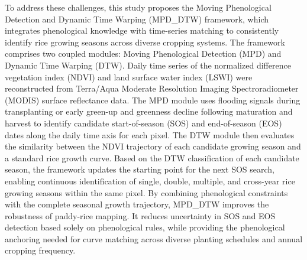 To address these challenges, this study proposes the Moving Phenological Detection and Dynamic Time Warping (MPD\_DTW) framework, which integrates phenological knowledge with time-series matching to consistently identify rice growing seasons across diverse cropping systems.
The framework comprises two coupled modules: Moving Phenological Detection (MPD) and Dynamic Time Warping (DTW). 
Daily time series of the normalized difference vegetation index (NDVI) and land surface water index (LSWI) were reconstructed from Terra/Aqua Moderate Resolution Imaging Spectroradiometer (MODIS) surface reflectance data. The MPD module uses flooding signals during transplanting or early green-up and greenness decline following maturation and harvest to identify candidate start-of-season (SOS) and end-of-season (EOS) dates along the daily time axis for each pixel.
The DTW module then evaluates the similarity between the NDVI trajectory of each candidate growing season and a standard rice growth curve. %
Based on the DTW classification of each candidate season, the framework updates the starting point for the next SOS search, enabling continuous identification of single, double, multiple, and cross-year rice growing seasons within the same pixel.
By combining phenological constraints with the complete seasonal growth trajectory, MPD\_DTW improves the robustness of paddy-rice mapping. It reduces uncertainty in SOS and EOS detection based solely on phenological rules, while providing the phenological anchoring needed for curve matching across diverse planting schedules and annual cropping frequency.

